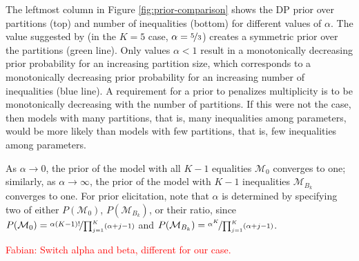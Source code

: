 \documentclass[11pt,a4paper]{article}
\theoremstyle{definition} %
\theoremstyle{case}
\newcommand{\FD}[1]{\textcolor{red}{Fabian: #1 }}
\begin{document}
The leftmost column in Figure \ref{fig:prior-comparison} shows the DP prior over partitions (top) and number of inequalities (bottom) for different values of $\alpha$. The value suggested by \textcite{gopalan1998bayesian} (in the $K = 5$ case, $\alpha = \nicefrac{5}{3}$) creates a symmetric prior over the partitions (green line). Only values $\alpha < 1$ result in a monotonically decreasing prior probability for an increasing partition size, which corresponds to a monotonically decreasing prior probability for an increasing number of inequalities (blue line). A requirement for a prior to penalizes multiplicity is to be monotonically decreasing with the number of partitions. If this were not the case, then models with many partitions, that is, many inequalities among parameters, would be more likely than models with few partitions, that is, few inequalities among parameters.

As $\alpha \rightarrow 0$, the prior of the model with all $K - 1$ equalities $\mathcal{M}_0$ converges to one; similarly, as $\alpha \rightarrow \infty$, the prior of the model with $K - 1$ inequalities $\mathcal{M}_{B_k}$ converges to one. For prior elicitation, \textcite{gopalan1998bayesian} note that $\alpha$ is determined by specifying two of either $P(\mathcal{M}_0)$, $P(\mathcal{M}_{B_k})$, or their ratio, since $P(\mathcal{M}_0) = \nicefrac{\alpha (K - 1)!}{\prod_{j = 1}^K (\alpha + j - 1)}$ and $P(\mathcal{M}_{B_k}) = \nicefrac{\alpha^K}{\prod_{j = 1}^K (\alpha + j - 1)}$.

\FD{Switch alpha and beta, different for our case.}

\end{document}
